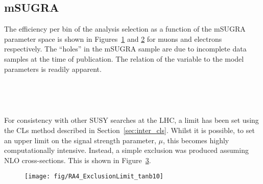 \subsection{\ac{mSUGRA}}
The efficiency per \STlep bin of the analysis selection as a function of the
\ac{mSUGRA} parameter space is shown in Figures~\ref{fig:inter_msugra_mu} and
\ref{fig:inter_msugra_el} for muons and electrons respectively. The ``holes'' in
the \ac{mSUGRA} sample are due to incomplete data samples at the time of
publication. The relation of the \STlep variable to the model parameters is
readily apparent.

\begin{figure}
\centering
{}
\\
\caption[]{}
\label{fig:inter_msugra_mu}
\end{figure}

\begin{figure}
\centering
{}
\\
\caption[]{}
\label{fig:inter_msugra_el}
\end{figure}

For consistency with other \ac{SUSY} searches at the \ac{LHC}, a limit has been
set using the \ac{CLs} method described in Section~\ref{sec:inter_cls}. Whilst
it is possible, to set an upper limit on the signal strength parameter, $\mu$,
this becomes highly computationally intensive. Instead, a simple exclusion was
produced assuming \ac{NLO} cross-sections. This is shown in
Figure~\ref{fig:inter_msugra_exclusion}.
\begin{figure}
\texttt{[image: fig/RA4\_ExclusionLimit\_tanb10]}
\label{fig:inter_msugra_exclusion}
\end{figure}

